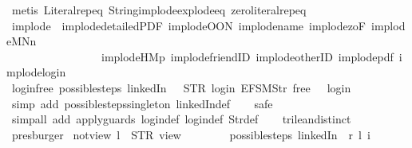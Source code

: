 \begin{isabellebody}
\ {\isacharparenleft}metis\ Literal{\isachardot}rep{\isacharunderscore}eq\ String{\isachardot}implode{\isacharunderscore}explode{\isacharunderscore}eq\ zero{\isacharunderscore}literal{\isachardot}rep{\isacharunderscore}eq{\isacharparenright}%
\endisatagproof
{\isafoldproof}%
%
\isadelimproof
\isanewline
%
\endisadelimproof
\isanewline
{}\isamarkupfalse%
\ implode\ {\isacharequal}\ implode{\isacharunderscore}detailedPDF\ implode{\isacharunderscore}OON\ implode{\isacharunderscore}name\ implode{\isacharunderscore}{}zoF\ implode{\isacharunderscore}MNn{}\isanewline
\ \ \ \ \ \ \ \ \ \ \ \ \ \ \ \ \ implode{\isacharunderscore}HM{}p\ implode{\isacharunderscore}friendID\ implode{\isacharunderscore}otherID\ implode{\isacharunderscore}pdf\ implode{\isacharunderscore}login\isanewline
\isanewline
{}\isamarkupfalse%
\ login{\isacharunderscore}free{\isacharcolon}\ {\isachardoublequoteopen}possible{\isacharunderscore}steps\ linkedIn\ {}\ {\isacharless}{\isachargreater}\ STR\ {\isacharprime}{\isacharprime}login{\isacharprime}{\isacharprime}\ {\isacharbrackleft}EFSM{\isachardot}Str\ {\isacharprime}{\isacharprime}free{\isacharprime}{\isacharprime}{\isacharbrackright}\ {\isacharequal}\ {\isacharbraceleft}{\isacharbar}{\isacharparenleft}{}{\isacharcomma}\ login{\isacharparenright}{\isacharbar}{\isacharbraceright}{\isachardoublequoteclose}\isanewline
%
\isadelimproof
\ \ %
\endisadelimproof
%
\isatagproof
{}\isamarkupfalse%
\ {\isacharparenleft}simp\ add{\isacharcolon}\ possible{\isacharunderscore}steps{\isacharunderscore}singleton\ linkedIn{\isacharunderscore}def{\isacharparenright}\isanewline
\ \ \isamarkupfalse%
\ safe\isanewline
\ \ \ \ \ \ \ \ \ \ \ \ \ \ \ \ \ \ \ \isamarkupfalse%
\ {\isacharparenleft}simp{\isacharunderscore}all\ add{\isacharcolon}\ apply{\isacharunderscore}guards\ login{\isacharunderscore}def\ login{}{\isacharunderscore}def\ Str{\isacharunderscore}def{\isacharparenright}\isanewline
\ \ \isamarkupfalse%
\ trilean{\isachardot}distinct{\isacharparenleft}{}{\isacharparenright}\ \isamarkupfalse%
\ presburger%
\endisatagproof
{\isafoldproof}%
%
\isadelimproof
\isanewline
%
\endisadelimproof
\isanewline
{}\isamarkupfalse%
\ not{\isacharunderscore}view{\isacharcolon}\ {\isachardoublequoteopen}l\ {\isasymnoteq}\ STR\ {\isacharprime}{\isacharprime}view{\isacharprime}{\isacharprime}\ {\isasymLongrightarrow}\isanewline
\ \ \ \ \ \ \ possible{\isacharunderscore}steps\ linkedIn\ {}\ r\ l\ i\ {\isacharequal}\ {\isacharbraceleft}{\isacharbar}{\isacharbar}{\isacharbraceright}{\isachardoublequoteclose}\isanewline

\end{isabellebody}
